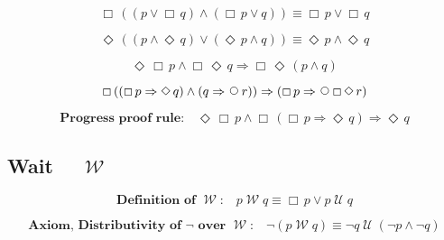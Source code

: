 \documentclass[12pt, fleqn, leqno]{article}
\newcommand{\impl}{\ensuremath{\Rightarrow}}        %
\newcommand{\Until}{\;\mathcal{U}\;}
\newcommand{\Wait}{\;\mathcal{W}\;}
\newcommand{\Next}{\;\,\text{\raisebox{3.5pt}{\circle{6}}}}
\newcommand{\Event}{\Diamond\,}
\newcommand{\Always}{\Box\,}
\newcommand{\spacer}{\vspace{-30pt}}
\newcommand{\firstspacer}{\vspace{-26pt}}
\begin{document}
\begin{equation}\label{E:BenAriequiv2}
\Always ((p \lor \Always q) \land (\Always p \lor q)) \equiv \Always p \lor \Always q
\end{equation}

\spacer

\begin{equation}\label{E:BenAriequiv3}
\Event ((p \land \Event q) \lor (\Event p \land q)) \equiv \Event p \land \Event q
\end{equation}

\spacer

\begin{equation}\label{E:eventAlwaysPAndAlwaysEventQ}
\Event\Always p\land \Always\Event q \impl \Always\Event (p\land q)
\end{equation}

\spacer

\begin{equation}\label{E:kroger49}
 \Always ((\Always p \impl \Event q) \land (q \impl \Next r)) \impl (\Always p \impl \Next \Always \Event r)
\end{equation}

\spacer

\begin{equation}\label{E:PrProofRule}
\textbf{Progress proof rule:}\quad \Event\Always p \land \Always(\Always p \impl \Event q) \impl \Event q
\end{equation}

\subsection*{Wait $\quad\Wait$}

\begin{equation}\label{E:defWait}
\textbf{Definition of $\Wait$:}\quad p \Wait q \equiv \Always p\lor p \Until q
\end{equation}

\firstspacer

\begin{equation}\label{E:notWait}
\textbf{Axiom, Distributivity of $\neg$ over $\Wait$:}\quad \neg (p \Wait q) \equiv \neg q \Until (\neg p \land \neg q)
\end{equation}
\end{document}
